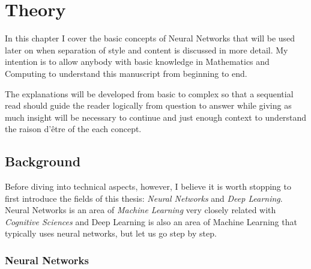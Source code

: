 
\chapter{Theory}
\label{sec:theory}


In this chapter I cover the basic concepts of Neural Networks that will be used later on when separation of style and content is discussed in more detail.
My intention is to allow anybody with basic knowledge in Mathematics and Computing to understand this manuscript from beginning to end.

The explanations will be developed from basic to complex so that a sequential read should guide the reader logically from question to answer while giving as much insight will be necessary to continue and just enough context to understand the raison d'être of the each concept.



\section{Background}
\label{sec:theory:background}

Before diving into technical aspects, however, I believe it is worth stopping to first introduce the fields of this thesis: \emph{Neural Networks} and \emph{Deep Learning}.
Neural Networks is an area of \emph{Machine Learning} very closely related with \emph{Cognitive Sciences} and Deep Learning is also an area of Machine Learning that typically uses neural networks, but let us go step by step.


\subsection{Neural Networks}
\label{sub:theory:background:neural-networks}

